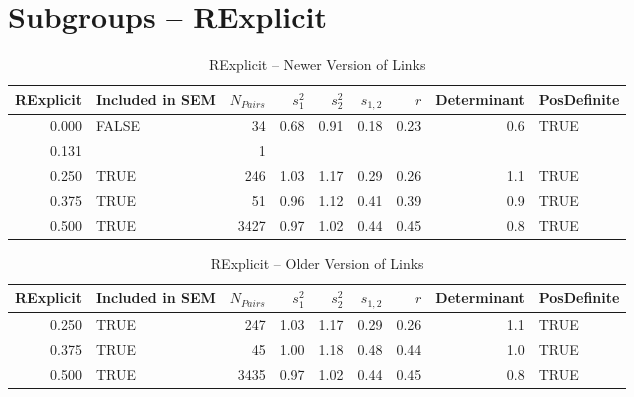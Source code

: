 \documentclass{article}\usepackage{graphicx, color}
\begin{document}
\section{Subgroups --  RExplicit }%
\begin{table}[ht]
\centering
\begin{tabular}{rlrrrrrrl}
  \hline
RExplicit & Included in SEM & $N_{Pairs}$ & $s_1^2$ & $s_2^2$ & $s_{1,2}$ & $r$ & Determinant & PosDefinite \\ 
  \hline
0.000 & FALSE & 34 & 0.68 & 0.91 & 0.18 & 0.23 & 0.6 & TRUE \\ 
  0.131 &  & 1 &  &  &  &  &  &  \\ 
  0.250 & TRUE & 246 & 1.03 & 1.17 & 0.29 & 0.26 & 1.1 & TRUE \\ 
  0.375 & TRUE & 51 & 0.96 & 1.12 & 0.41 & 0.39 & 0.9 & TRUE \\ 
  0.500 & TRUE & 3427 & 0.97 & 1.02 & 0.44 & 0.45 & 0.8 & TRUE \\ 
   \hline
\end{tabular}
\caption{RExplicit -- Newer Version of Links} 
\end{table}
\begin{table}[ht]
\centering
\begin{tabular}{rlrrrrrrl}
  \hline
RExplicit & Included in SEM & $N_{Pairs}$ & $s_1^2$ & $s_2^2$ & $s_{1,2}$ & $r$ & Determinant & PosDefinite \\ 
  \hline
0.250 & TRUE & 247 & 1.03 & 1.17 & 0.29 & 0.26 & 1.1 & TRUE \\ 
  0.375 & TRUE & 45 & 1.00 & 1.18 & 0.48 & 0.44 & 1.0 & TRUE \\ 
  0.500 & TRUE & 3435 & 0.97 & 1.02 & 0.44 & 0.45 & 0.8 & TRUE \\ 
   \hline
\end{tabular}
\caption{RExplicit -- Older Version of Links} 
\end{table}
\newpage 
\end{document}
